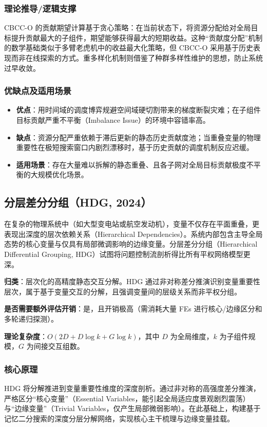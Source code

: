 \subsubsection*{理论推导/逻辑支撑}
CBCC-O 的贡献期望计算基于贪心策略：在当前状态下，将资源分配给对全局目标提升贡献最大的子组件，期望能够获得最大的短期收益。这种“贡献度分配”机制的数学基础类似于多臂老虎机中的收益最大化策略，但 CBCC-O 采用基于历史表现而非在线探索的方式。重多样化机制则借鉴了种群多样性维护的思想，防止系统过早收敛。

\subsubsection*{优缺点及适用场景}
\begin{itemize}
    \item \textbf{优点}：用时间域的调度博弈规避空间域硬切割带来的梯度断裂灾难；在子组件目标贡献严重不平衡（Imbalance Issue）的环境中容错率高。
    \item \textbf{缺点}：资源分配严重依赖于滞后更新的静态历史贡献度池；当重叠变量的物理重要性在极短搜索窗口内剧烈漂移时，基于历史贡献的调度机制反应迟缓。
    \item \textbf{适用场景}：存在大量难以拆解的静态重叠、且各子网对全局目标贡献极度不平衡的大规模优化场景。
\end{itemize}

\subsection{分层差分分组（HDG, 2024）}
在复杂的物理系统中（如大型变电站或航空发动机），变量不仅存在平面重叠，更表现出深度的层次依赖关系（Hierarchical Dependencies）。系统内部包含主导全局态势的核心变量与仅具有局部微调影响的边缘变量。分层差分分组（Hierarchical Differential Grouping, HDG）试图将问题控制流剖析得比所有平权网络模型更深。

\textbf{归类}：层次化的高精度静态交互分解。HDG 通过非对称差分推演识别变量重要性层次，属于基于变量交互的分解，且强调变量间的层级关系而非平权分组。

\textbf{是否需要额外评估开销}：是，且开销极高（需消耗大量 FEs 进行核心/边缘区分和多轮递归探测）。

\textbf{理论复杂度}：$O(2D + D \log k + G \log k)$，其中 $D$ 为全局维度，$k$ 为子组件规模，$G$ 为间接交互组数。

\subsubsection*{核心原理}
HDG 将分解推进到变量重要性维度的深度剖析。通过非对称的高强度差分推演，严格区分“核心变量”（Essential Variables，能引起全局适应度景观剧烈震荡）与“边缘变量”（Trivial Variables，仅产生局部微弱影响）。在此基础上，构建基于记忆二分搜索的深度分层分解网络，实现核心主干梳理与边缘变量挂载。

